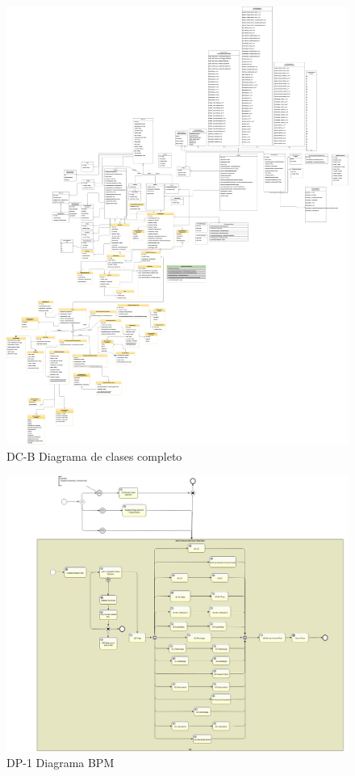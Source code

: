 	\begin{figure}[H]
	    \centering
		\includegraphics[width=18cm]{../imgs/disenio/DC.png}
		\caption{DC-B Diagrama de clases completo}
	\end{figure}
	\begin{figure}[H]
	    \centering
		\includegraphics[width=18cm]{../imgs/disenio/ProcesoAtencion.png}
		\caption{DP-1 Diagrama BPM}
	\end{figure}
\newpage

